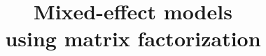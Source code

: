 \documentclass[preprint]{imsart}
\numberwithin{equation}{section}
\theoremstyle{plain}
\begin{document}
\begin{frontmatter}
\title{Mixed-effect models\\using matrix factorization}








\end{frontmatter}

\maketitle

\end{document}
